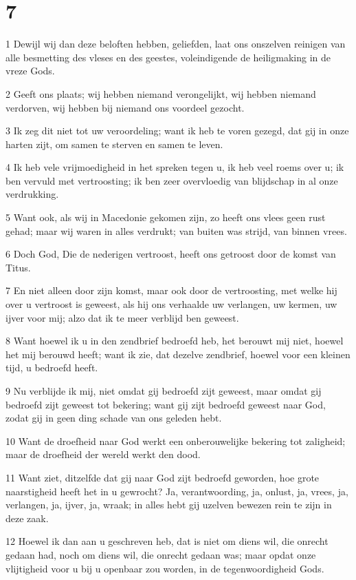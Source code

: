 \chapter{7}

\par 1 Dewijl wij dan deze beloften hebben, geliefden, laat ons onszelven reinigen van alle besmetting des vleses en des geestes, voleindigende de heiligmaking in de vreze Gods.
\par 2 Geeft ons plaats; wij hebben niemand verongelijkt, wij hebben niemand verdorven, wij hebben bij niemand ons voordeel gezocht.
\par 3 Ik zeg dit niet tot uw veroordeling; want ik heb te voren gezegd, dat gij in onze harten zijt, om samen te sterven en samen te leven.
\par 4 Ik heb vele vrijmoedigheid in het spreken tegen u, ik heb veel roems over u; ik ben vervuld met vertroosting; ik ben zeer overvloedig van blijdschap in al onze verdrukking.
\par 5 Want ook, als wij in Macedonie gekomen zijn, zo heeft ons vlees geen rust gehad; maar wij waren in alles verdrukt; van buiten was strijd, van binnen vrees.
\par 6 Doch God, Die de nederigen vertroost, heeft ons getroost door de komst van Titus.
\par 7 En niet alleen door zijn komst, maar ook door de vertroosting, met welke hij over u vertroost is geweest, als hij ons verhaalde uw verlangen, uw kermen, uw ijver voor mij; alzo dat ik te meer verblijd ben geweest.
\par 8 Want hoewel ik u in den zendbrief bedroefd heb, het berouwt mij niet, hoewel het mij berouwd heeft; want ik zie, dat dezelve zendbrief, hoewel voor een kleinen tijd, u bedroefd heeft.
\par 9 Nu verblijde ik mij, niet omdat gij bedroefd zijt geweest, maar omdat gij bedroefd zijt geweest tot bekering; want gij zijt bedroefd geweest naar God, zodat gij in geen ding schade van ons geleden hebt.
\par 10 Want de droefheid naar God werkt een onberouwelijke bekering tot zaligheid; maar de droefheid der wereld werkt den dood.
\par 11 Want ziet, ditzelfde dat gij naar God zijt bedroefd geworden, hoe grote naarstigheid heeft het in u gewrocht? Ja, verantwoording, ja, onlust, ja, vrees, ja, verlangen, ja, ijver, ja, wraak; in alles hebt gij uzelven bewezen rein te zijn in deze zaak.
\par 12 Hoewel ik dan aan u geschreven heb, dat is niet om diens wil, die onrecht gedaan had, noch om diens wil, die onrecht gedaan was; maar opdat onze vlijtigheid voor u bij u openbaar zou worden, in de tegenwoordigheid Gods.
